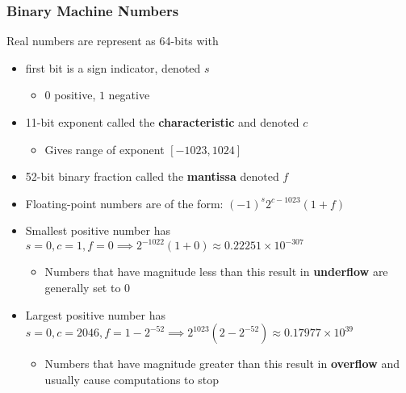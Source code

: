 \documentclass{article}
\begin{document}
  \subsubsection{Binary Machine Numbers}
  Real numbers are represent as 64-bits with
  \begin{itemize}
    \item first bit is a sign indicator, denoted $s$
      \begin{itemize}
        \item $0$ positive, $1$ negative
      \end{itemize}
    \item 11-bit exponent called the \textbf{characteristic} and denoted $c$
      \begin{itemize}
        \item Gives range of exponent $[-1023, 1024]$
      \end{itemize}
    \item 52-bit binary fraction called the \textbf{mantissa} denoted $f$
    \item Floating-point numbers are of the form: $(-1)^s 2^{c - 1023}(1 + f)$
    \item Smallest positive number has $s = 0, c= 1, f = 0 \implies 2^{-1022}(1+0) \approx 0.22251 \times 10^{-307}$
      \begin{itemize}
        \item Numbers that have magnitude less than this result in \textbf{underflow} are generally set to $0$
      \end{itemize}
    \item Largest positive number has $s = 0, c= 2046, f = 1- 2^{-52} \implies 2^{1023} (2 - 2^{-52}) \approx 0.17977 \times 10^{39}$
      \begin{itemize}
        \item Numbers that have magnitude greater than this result in \textbf{overflow} and usually cause computations to stop
      \end{itemize}
  \end{itemize}
\end{document}
